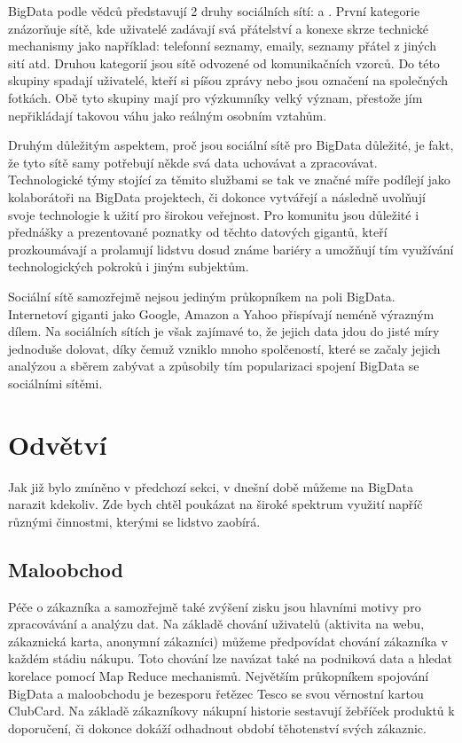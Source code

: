 BigData podle vědců představují 2 druhy sociálních sítí:  a . První kategorie znázorňuje sítě, kde uživatelé zadávají svá přátelství a konexe skrze technické mechanismy jako například: telefonní seznamy, emaily, seznamy přátel z jiných sití atd. Druhou kategorií jsou sítě odvozené od komunikačních vzorců. Do této skupiny spadají uživatelé, kteří si píšou zprávy nebo jsou označení na společných fotkách. Obě tyto skupiny mají pro výzkumníky velký význam, přestože jím nepřikládají takovou váhu jako reálným osobním vztahům. \cite{social} %

Druhým důležitým aspektem, proč jsou sociální sítě pro BigData důležité, je fakt, že tyto sítě samy potřebují někde svá data uchovávat a zpracovávat. Technologické týmy stojící za těmito službami se tak ve značné míře podílejí jako kolaborátoři na BigData projektech, či dokonce vytvářejí a následně uvolňují svoje technologie k užití pro širokou veřejnost. Pro komunitu jsou důležité i přednášky a prezentované poznatky od těchto datových gigantů, kteří prozkoumávají a prolamují lidstvu dosud známe bariéry a umožňují tím využívání technologických pokroků i jiným subjektům. 

Sociální sítě samozřejmě nejsou jediným průkopníkem na poli BigData. Internetoví giganti jako Google, Amazon a Yahoo přispívají neméně výrazným dílem. Na sociálních sítích je však zajímavé to, že jejich data jdou do jisté míry jednoduše dolovat, díky čemuž vzniklo mnoho spolčeností, které se začaly jejich analýzou a sběrem zabývat a způsobily tím popularizaci spojení BigData se sociálními sítěmi. 


\section{Odvětví}

Jak již bylo zmíněno v předchozí sekci, v dnešní době můžeme na BigData narazit kdekoliv. Zde bych chtěl poukázat na široké spektrum využití napříč různými činnostmi, kterými se lidstvo zaobírá.\cite{sektory}

\subsection{Maloobchod}
Péče o zákazníka a samozřejmě také zvýšení zisku jsou hlavními motivy pro zpracovávání a analýzu dat. Na základě chování uživatelů (aktivita na webu, zákaznická karta, anonymní zákazníci) můžeme předpovídat chování zákazníka v každém stádiu nákupu. Toto chování lze navázat také na podniková data a hledat korelace pomocí Map Reduce mechanismů. Největším průkopníkem spojování BigData a maloobchodu je bezesporu řetězec Tesco se svou věrnostní kartou ClubCard. Na základě zákazníkovy nákupní historie sestavují žebříček produktů k doporučení, či dokonce dokáží odhadnout období těhotenství svých zákaznic.\cite{tesco}


